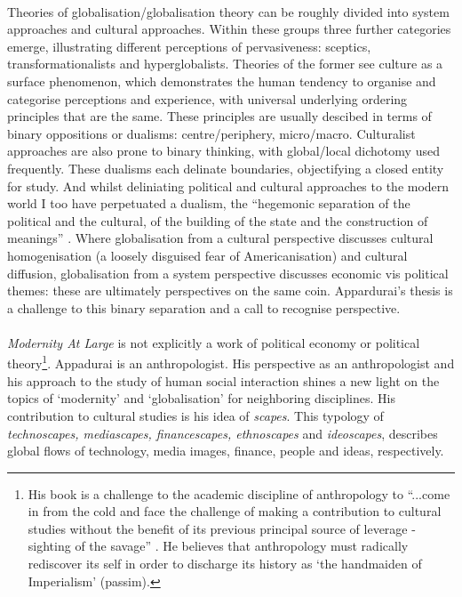 \documentclass{article}
\begin{document}
\begin{doublespacing}
\paragraph{}Theories of globalisation/globalisation theory can be roughly divided into system approaches and cultural approaches. Within these groups three further categories emerge, illustrating different perceptions of pervasiveness: sceptics, transformationalists and hyperglobalists\cite[p.120-121]{Hoogvelt:2001gp}. Theories of the former see culture as a surface phenomenon,  which demonstrates the human tendency to organise and categorise perceptions and experience, with universal underlying ordering principles that are the same. These principles are usually descibed in terms of binary oppositions or dualisms: centre/periphery, micro/macro. Culturalist approaches are also prone to binary thinking, with global/local dichotomy used frequently. These dualisms each delinate boundaries, objectifying a closed entity for study. And whilst deliniating political and cultural approaches to the modern world I too have perpetuated a dualism, the ``hegemonic separation of the political and the cultural, of the building of the state and the construction of meanings'' \cite[p.81]{Krohn:2003}. Where globalisation from a cultural perspective discusses cultural homogenisation (a loosely disguised fear of Americanisation) and cultural diffusion, globalisation from a system perspective discusses economic vis political themes: these are ultimately perspectives on the same coin. Appardurai's thesis is a challenge to this binary separation and a call to recognise perspective.

\paragraph{} \emph{Modernity At Large} is not explicitly a work of political economy or political theory\footnote{His book is a challenge to the academic discipline of anthropology to ``...come in from the cold and face the challenge of making a contribution to cultural studies without the benefit of its previous principal source of leverage - sighting of the savage'' \cite[p.65]{Appadurai:1996lp}. He believes that anthropology must radically rediscover its self in order to discharge its history as `the handmaiden of Imperialism' (passim).}. Appadurai is an anthropologist. His perspective as an anthropologist and his approach to the study of human social interaction shines a new light on the topics of `modernity' and `globalisation' for neighboring disciplines. His contribution to cultural studies is his idea of \emph{scapes}. This typology of \emph{technoscapes, mediascapes, financescapes, ethnoscapes} and \emph{ideoscapes}, describes global flows of technology, media images, finance, people and ideas, respectively.


\end{doublespacing}
\end{document}
